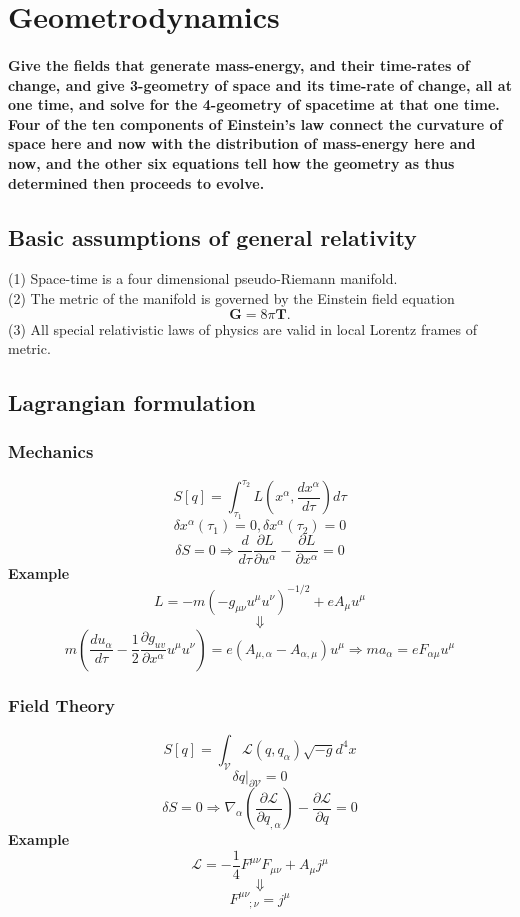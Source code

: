 \documentclass{article}
\begin{document}
\section{Geometrodynamics}
\paragraph*{Give the fields that generate mass-energy, and their time-rates of change, and give 3-geometry of space and its time-rate of change, all at one time, and solve for the 4-geometry of spacetime at that one time. Four of the ten components of Einstein's law connect the curvature of space here and now with the distribution of mass-energy here and now, and the other six equations tell how the geometry as thus determined then proceeds to evolve.}

\subsection{Basic assumptions of general relativity}
(1) Space-time is a four dimensional pseudo-Riemann manifold.\\
(2) The metric of the manifold is governed by the Einstein field equation
\[\mathbf{G} = 8\pi\mathbf{T}.\]
(3) All special relativistic laws of physics are valid in local Lorentz frames of metric.

\subsection{Lagrangian formulation}
\subsubsection{Mechanics}
\[S[q] = \int_{\tau_1}^{\tau_2} L(x^{\alpha},\frac{dx^{\alpha}}{d\tau}) d\tau\]
\[\delta x^{\alpha}(\tau_1)=0, \delta x^{\alpha}(\tau_2)=0\]
\[\delta S = 0 \Rightarrow \frac{d}{d\tau} \frac{\partial L}{\partial u^{\alpha}} - \frac{\partial L}{\partial x^{\alpha}}=0\]
\textbf{Example}
\[L = -m(-g_{\mu\nu} u^{\mu} u^{\nu})^{-1/2} + e A_{\mu} u^{\mu}\]
\[\Downarrow\]
\[m(\frac{du_{\alpha}}{d\tau} - \frac{1}{2} \frac{\partial g_{uv}}{\partial x^{\alpha}} u^{\mu} u^{\nu}) = e(A_{\mu,\alpha}-A_{\alpha,\mu})u^{\mu} \Rightarrow ma_{\alpha} = eF_{\alpha\mu} u^{\mu} \]

\subsubsection{Field Theory}
\[S[q] = \int_{\mathcal{V}} \mathcal{L}(q,q_{\alpha})\sqrt{-g} d^4x\]
\[\delta q|_{\partial \mathcal{V}} = 0\]
\[\delta S = 0 \Rightarrow \nabla_{\alpha} (\frac{\partial \mathcal{L}}{\partial q_{,\alpha}}) - \frac{\partial \mathcal{L}}{\partial q} = 0\]
\textbf{Example}
\[\mathcal{L} = -\frac{1}{4} F^{\mu \nu} F_{\mu \nu} + A_{\mu} j^{\mu}\]
\[\Downarrow\]
\[F^{\mu \nu}_{\phantom{\mu \nu} ;\nu} = j^{\mu}\]
\end{document}
